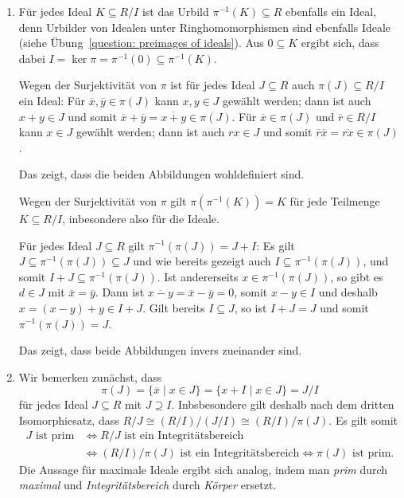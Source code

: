 \begin{solution}
  \begin{enumerate}
    \item
      Für jedes Ideal $K \subseteq R/I$ ist das Urbild $\pi^{-1}(K) \subseteq R$ ebenfalls ein Ideal, denn Urbilder von Idealen unter Ringhomomorphismen sind ebenfalls Ideale (siehe Übung~\ref{question: preimages of ideals}).
      Aus $0 \subseteq K$ ergibt sich, dass dabei $I = \ker \pi = \pi^{-1}(0) \subseteq \pi^{-1}(K)$.
      
      Wegen der Surjektivität von $\pi$ ist für jedes Ideal $J \subseteq R$ auch $\pi(J) \subseteq R/I$ ein Ideal:
      Für $\overline{x}, \overline{y} \in \pi(J)$ kann $x, y \in J$ gewählt werden;
      dann ist auch $x + y \in J$ und somit $\overline{x} + \overline{y} = \overline{x + y} \in \pi(J)$.
      Für $\overline{x} \in \pi(J)$ und $\overline{r} \in R/I$ kann $x \in J$ gewählt werden;
      dann ist auch $r x \in J$ und somit $\overline{r} \overline{x} = \overline{r x} \in \pi(J)$.
      
      Das zeigt, dass die beiden Abbildungen wohldefiniert sind.
      
      Wegen der Surjektivität von $\pi$ gilt $\pi(\pi^{-1}(K)) = K$ für jede Teilmenge $K \subseteq R/I$, inbesondere also für die Ideale.
      
      Für jedes Ideal $J \subseteq R$ gilt $\pi^{-1}(\pi(J)) = J + I$:
      Es gilt $J \subseteq \pi^{-1}(\pi(J)) \subseteq J$ und wie bereits gezeigt auch $I \subseteq \pi^{-1}(\pi(J))$, und somit $I + J \subseteq \pi^{-1}(\pi(J))$.
      Ist andererseits $x \in \pi^{-1}(\pi(J))$, so gibt es $d \in J$ mit $\overline{x} = \overline{y}$.
      Dann ist $\overline{x-y} = \overline{x} - \overline{y} = 0$, somit $x - y \in I$ und deshalb $x = (x-y) + y \in I + J$.
      Gilt bereits $I \subseteq J$, so ist $I + J = J$ und somit $\pi^{-1}(\pi(J)) = J$.
      
      Das zeigt, dass beide Abbildungen invers zueinander sind.
    \item
      Wir bemerken zunächst, dass
      \[
          \pi(J)
        = \{ \overline{x} \mid x \in J \}
        = \{ x + I \mid x \in J \}
        = J/I
      \]
      für jedes Ideal $J \subseteq R$ mit $J \supseteq I$.
      Inbsbesondere gilt deshalb nach dem dritten Isomorphiesatz, dass $R/J \cong (R/I)/(J/I) \cong (R/I)/\pi(J)$.
      Es gilt somit
      \begin{align*}
              \text{$J$ ist prim}
        &\iff \text{$R/J$ ist ein Integritätsbereich}
        \\
        &\iff \text{$(R/I)/\pi(J)$ ist ein Integritätsbereich}
         \iff \text{$\pi(J)$ ist prim}.
      \end{align*}
      Die Aussage für maximale Ideale ergibt sich analog, indem man \emph{prim} durch \emph{maximal} und \emph{Integritätsbereich} durch \emph{Körper} ersetzt.
  \end{enumerate}
\end{solution}


